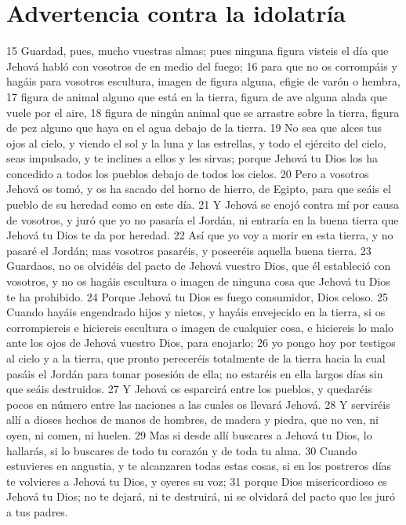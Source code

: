 \section{Advertencia contra la idolatría}

15 Guardad, pues, mucho vuestras almas; pues ninguna figura visteis el día que Jehová habló con vosotros de en medio del fuego;
16 para que no os corrompáis y hagáis para vosotros escultura, imagen de figura alguna, efigie de varón o hembra,
17 figura de animal alguno que está en la tierra, figura de ave alguna alada que vuele por el aire,
18 figura de ningún animal que se arrastre sobre la tierra, figura de pez alguno que haya en el agua debajo de la tierra.
19 No sea que alces tus ojos al cielo, y viendo el sol y la luna y las estrellas, y todo el ejército del cielo, seas impulsado, y te inclines a ellos y les sirvas; porque Jehová tu Dios los ha concedido a todos los pueblos debajo de todos los cielos.
20 Pero a vosotros Jehová os tomó, y os ha sacado del horno de hierro, de Egipto, para que seáis el pueblo de su heredad como en este día.
21 Y Jehová se enojó contra mí por causa de vosotros, y juró que yo no pasaría el Jordán, ni entraría en la buena tierra que Jehová tu Dios te da por heredad.
22 Así que yo voy a morir en esta tierra, y no pasaré el Jordán; mas vosotros pasaréis, y poseeréis aquella buena tierra.
23 Guardaos, no os olvidéis del pacto de Jehová vuestro Dios, que él estableció con vosotros, y no os hagáis escultura o imagen de ninguna cosa que Jehová tu Dios te ha prohibido.
24 Porque Jehová tu Dios es fuego consumidor, Dios celoso.
25 Cuando hayáis engendrado hijos y nietos, y hayáis envejecido en la tierra, si os corrompiereis e hiciereis escultura o imagen de cualquier cosa, e hiciereis lo malo ante los ojos de Jehová vuestro Dios, para enojarlo;
26 yo pongo hoy por testigos al cielo y a la tierra, que pronto pereceréis totalmente de la tierra hacia la cual pasáis el Jordán para tomar posesión de ella; no estaréis en ella largos días sin que seáis destruidos.
27 Y Jehová os esparcirá entre los pueblos, y quedaréis pocos en número entre las naciones a las cuales os llevará Jehová.
28 Y serviréis allí a dioses hechos de manos de hombres, de madera y piedra, que no ven, ni oyen, ni comen, ni huelen.
29 Mas si desde allí buscares a Jehová tu Dios, lo hallarás, si lo buscares de todo tu corazón y de toda tu alma.
30 Cuando estuvieres en angustia, y te alcanzaren todas estas cosas, si en los postreros días te volvieres a Jehová tu Dios, y oyeres su voz;
31 porque Dios misericordioso es Jehová tu Dios; no te dejará, ni te destruirá, ni se olvidará del pacto que les juró a tus padres.
